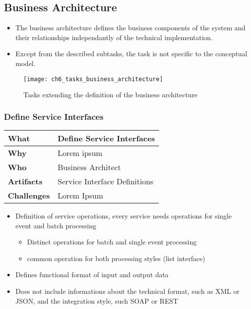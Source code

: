 \subsection{Business Architecture}

\begin{itemize}
	\item The business architecture defines the business components of the system and their relationships independantly of the technical implementation.
	\item Except from the described subtasks, the task is not specific to the conceptual model.
\end{itemize}

\begin{figure}[htpb] \centering 
	\texttt{[image: ch6\_tasks\_business\_architecture]} 
	\caption{Tasks extending the definition of the business architecture} 
	\label{fig:ch6_tasks_business_architecture} 
\end{figure}

\subsubsection{Define Service Interfaces}
\begin{minipage}{\textwidth}
 \label{table:ch6_Task_Define_Service_Interfaces}
\begin{tabular}
	{|m{3cm}|m{10cm}|} \hline \bfseries What & Define Service Interfaces\\
	\hline \bfseries Why & Lorem ipsum\\
	\hline \bfseries Who & Business Architect\\
	\hline \bfseries Artifacts & Service Interface Definitions\\
	\hline \bfseries Challenges & Lorem Ipsum\\
	\hline 
\end{tabular}
\end{minipage}

\begin{itemize}
	\item Definition of service operations, every service needs operations for single event and batch processing
	\begin{itemize}
		\item Distinct operations for batch and single event processing
		\item common operation for both processing styles (list interface)
	\end{itemize}
	\item Defines functional format of input and output data
	\item Does not include informations about the technical format, such as \ac{XML} or \ac{JSON}, and the integration style, such SOAP or \ac{REST}
\end{itemize}

